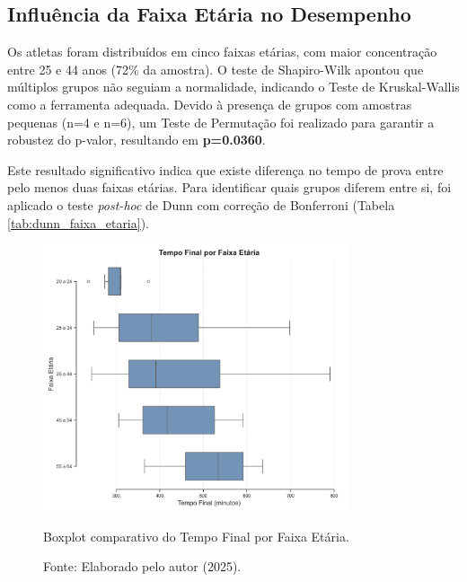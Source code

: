 \subsection{Influência da Faixa Etária no Desempenho}

Os atletas foram distribuídos em cinco faixas etárias, com maior concentração entre 25 e 44 anos (72\% da amostra). O teste de Shapiro-Wilk apontou que múltiplos grupos não seguiam a normalidade, indicando o Teste de Kruskal-Wallis como a ferramenta adequada. Devido à presença de grupos com amostras pequenas (n=4 e n=6), um Teste de Permutação foi realizado para garantir a robustez do p-valor, resultando em \textbf{p=0.0360}.

Este resultado significativo indica que existe diferença no tempo de prova entre pelo menos duas faixas etárias. Para identificar quais grupos diferem entre si, foi aplicado o teste \textit{post-hoc} de Dunn com correção de Bonferroni (Tabela \ref{tab:dunn_faixa_etaria}).

\begin{figure}[H]
    \centering
    \includegraphics[width=0.8\textwidth]{Imagens/boxplot_tempo_por_faixa_etaria.png}
    \caption{Boxplot comparativo do Tempo Final por Faixa Etária.}
    \label{fig:boxplot_idade}
    \caption*{Fonte: Elaborado pelo autor (2025).}
\end{figure}

